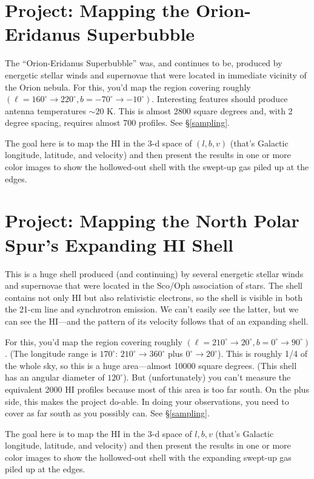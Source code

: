\documentclass[psfig,preprint]{aastex}
\begin{document}
\section{Project: Mapping the Orion-Eridanus Superbubble} \label{eridanus}

\noindent
The ``Orion-Eridanus Superbubble'' was, and continues to be, produced by
energetic stellar winds and supernovae that were located in immediate
vicinity of the Orion nebula. For this, you'd map the region covering
roughly $(\ell=160^\circ \rightarrow 220^\circ, b=-70^\circ \rightarrow
-10^\circ)$. Interesting features should produce antenna temperatures
$\sim 20$ K. This is almost 2800 square degrees and, with 2 degree
spacing, requires almost 700 profiles. See \S \ref{sampling}.

The goal here is to map the HI in the 3-d space of $(l, b, v)$ (that's
Galactic longitude, latitude, and velocity) and then present the results
in one or more color images to show the hollowed-out shell with the
swept-up gas piled up at the edges.

\section{Project: Mapping the North Polar Spur's Expanding HI Shell}

\noindent
This is a huge shell produced (and continuing) by several energetic
stellar winds and supernovae that were located in the Sco/Oph
association of stars. The shell contains not only HI but also
relativistic electrons, so the shell is visible in both the 21-cm line
and synchrotron emission. We can't easily see the latter, but we can see
the HI---and the pattern of its velocity follows that of an expanding
shell.

For this, you'd map the region covering roughly $(\ell=210^\circ
\rightarrow 20^\circ, b=0^\circ \rightarrow 90^\circ)$. (The longitude
range is $170^\circ$: $210^\circ \rightarrow 360^\circ$ plus $0^\circ
\rightarrow 20^\circ$). This is roughly 1/4 of the whole sky, so this is
a huge area---almost 10000 square degrees. (This shell has an angular
diameter of $120^\circ$). But (unfortunately) you can't measure the
equivalent 2000 HI profiles because most of this area is too far
south. On the plus side, this makes the project do-able. In doing your
observations, you need to cover as far south as you possibly can. See
\S \ref{sampling}.

The goal here is to map the HI in the 3-d space of ${l, b, v}$ (that's
Galactic longitude, latitude, and velocity) and then present the results
in one or more color images to show the hollowed-out shell with the
expanding swept-up gas piled up at the edges.
\end{document}
